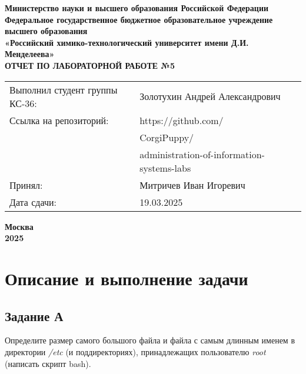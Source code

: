\documentclass[12pt, a4paper]{report}
\begin{document}
	\begin{titlepage}
			\begin{center}
				\large \textbf{Министерство науки и высшего образования Российской Федерации} \\
				\large \textbf{Федеральное государственное бюджетное образовательное учреждение высшего образования} \\
				\large \textbf{«Российский химико-технологический университет имени Д.И. Менделеева»} \\

				\vspace*{4cm}
				\LARGE \textbf{ОТЧЕТ ПО ЛАБОРАТОРНОЙ РАБОТЕ №5}

				\vspace*{4cm}
				\begin{flushright}
					\Large
					\begin{tabular}{>{\raggedleft\arraybackslash}p{8.85cm} p{10.8cm}}
						Выполнил студент группы КС-36: & Золотухин Андрей Александрович \\
						Ссылка на репозиторий: & https://github.com/ \\ 
						& CorgiPuppy/ \\
						& administration-of-information-systems-labs \\
						Принял: & Митричев Иван Игоревич \\
						Дата сдачи: & 19.03.2025 \\
					\end{tabular}

				\end{flushright}

				\vspace*{6cm}
				\Large \textbf{Москва \\ 2025}
			\end{center}
		\end{titlepage}
		
		\tableofcontents	
		\thispagestyle{empty}
		\newpage

		
		\section*{Описание и выполнение задачи}
		\large
		
		\subsection*{Задание А}
		Определите размер самого большого файла и файла с самым длинным именем в директории \textit{/etc} (и поддиректориях), принадлежащих пользователю \textit{root} (написать скрипт bash).
\end{document}
